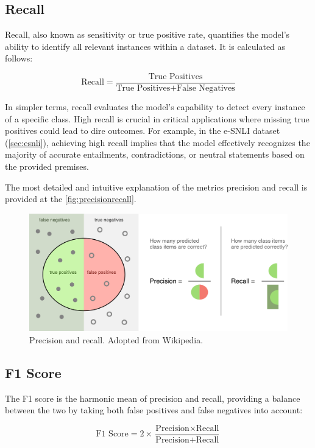 \subsection{Recall}

Recall, also known as sensitivity or true positive rate, quantifies the model's ability to identify all relevant instances within a dataset. It is calculated as follows:

$$
    \text{Recall} = \frac{\text{True Positives}}{\text{True Positives} + \text{False Negatives}}
$$

In simpler terms, recall evaluates the model's capability to detect every instance of a specific class. High recall is crucial in critical applications where missing true positives could lead to dire outcomes. For example, in the e-SNLI dataset (\autoref{sec:esnli}), achieving high recall implies that the model effectively recognizes the majority of accurate entailments, contradictions, or neutral statements based on the provided premises.

The most detailed and intuitive explanation of the metrics precision and recall is provided at the \autoref{fig:precisionrecall}.

\begin{figure}[h!]
    \centering
    \includegraphics[width=0.9\linewidth]{figs/precisionrecall.jpg}
    \caption[Precision and recall]{Precision and recall. Adopted from Wikipedia\protect\footnotemark.}
    \label{fig:precisionrecall}
\end{figure}


\subsection{F1 Score}
The F1 score is the harmonic mean of precision and recall, providing a balance between the two by taking both false positives and false negatives into account:

$$
    \text{F1 Score} = 2 \times \frac{\text{Precision} \times \text{Recall}}{\text{Precision} + \text{Recall}}
$$

